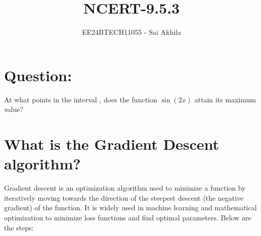 \documentclass[journal]{IEEEtran}
\begin{document}

\vspace{3cm}

\title{NCERT-9.5.3}
\author{EE24BTECH11055 - Sai Akhila}
{\let\newpage\relax\maketitle}

\renewcommand{\thefigure}{\theenumi}
\renewcommand{\thetable}{\theenumi}
\setlength{\intextsep}{10pt} %


\renewcommand{\thetable}{\theenumi}

\section*{Question:}
At what points in the interval , does the function $\sin(2x)$ attain its maximum value?
\section*{What is the Gradient Descent algorithm?}
Gradient descent is an optimization algorithm used to minimize a function by iteratively moving towards the direction of the steepest descent (the negative gradient) of the function. It is widely used in machine learning and mathematical optimization to minimize loss functions and find optimal parameters.
Below are the steps:\\
\end{document}
